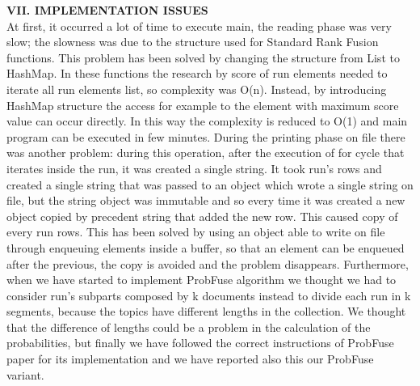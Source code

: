 \documentclass[12pt,journal]{IEEEtran}
\begin{document}
\textbf{VII. IMPLEMENTATION ISSUES} \\
At first, it occurred a lot of time to execute main, the reading phase was very slow; the slowness was due to the structure used for Standard Rank Fusion functions. This problem has been solved by changing the structure from List to HashMap. 
In these functions the research by score of run elements needed to iterate all run elements list, so complexity was O(n). Instead, by introducing HashMap structure the access for example to the element with maximum score value can occur directly. In this way the complexity is reduced to O(1) and main program can be executed in few minutes. 
During the printing phase on file there was another problem: during this operation, after the execution of for cycle that iterates inside the run, it was created a single string. It took run’s rows and created a single string that was passed to an object which wrote a single string on file, but the string object was immutable and so every time it was created a new object copied by precedent string that added the new row. This caused copy of every run rows. This has been solved by using an object able to write on file through enqueuing elements inside a buffer, so that an element can be enqueued after the previous, the copy is avoided and the problem disappears.
Furthermore, when we have started to implement ProbFuse algorithm we thought we had to consider run's subparts composed by k documents instead to divide each run in k segments, because the topics have different lengths in the collection. We thought that the difference of lengths could be a problem in the calculation of the probabilities, but finally we have followed the correct instructions of ProbFuse paper for its implementation and we have reported also this our ProbFuse variant. 
 \\
\end{document}
